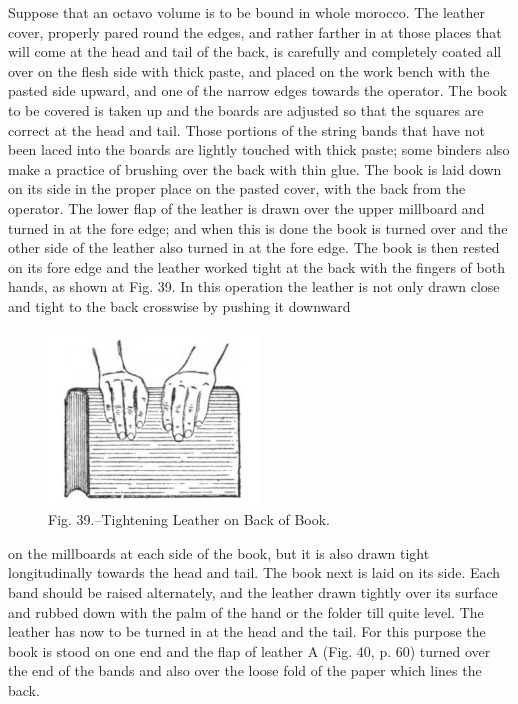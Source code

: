 \documentclass[twoside]{book}
\begin{document}
Suppose that an octavo volume is to be bound
in whole morocco. The leather cover, properly
pared round the edges, and rather farther in at
those places that will come at the head and tail of
the back, is carefully and completely coated all over
on the flesh side with thick paste, and placed on
the work bench with the pasted side upward, and
one of the narrow edges towards the operator. The
book to be covered is taken up and the boards are
adjusted so that the squares are correct at the head
and tail. Those portions of the string bands that
have not been laced into the boards are lightly
\pagebreak
touched with thick paste; some binders also make
a practice of brushing over the back with thin glue.
The book is laid down on its side in the proper
place on the pasted cover, with the back from the
operator. The lower flap of the leather is drawn
over the upper millboard and turned in at the fore
edge; and when this is done the book is turned over
and the other side of the leather also turned in at
the fore edge. The book is then rested on its fore
edge and the leather worked tight at the back with
the fingers of both hands, as shown at Fig. 39. In
this operation the leather is not only drawn close
and tight to the back crosswise by pushing it downward
	\begin{figure}[h]
		\centering
		\includegraphics[width=0.5\textwidth]{Figures/_039.png}
		\caption*{Fig. 39.--Tightening Leather on Back of Book.}
	\end{figure}
on the millboards at each side of the book,
but it is also drawn tight longitudinally towards the
head and tail. The book next is laid on its side.
Each band should be raised alternately, and the
leather drawn tightly over its surface and rubbed
down with the palm of the hand or the folder till
quite level. The leather has now to be turned in
at the head and the tail. For this purpose the book
is stood on one end and the flap of leather A (Fig.
40, p. 60) turned over the end of the bands and also
over the loose fold of the paper which lines the back.
\end{document}
